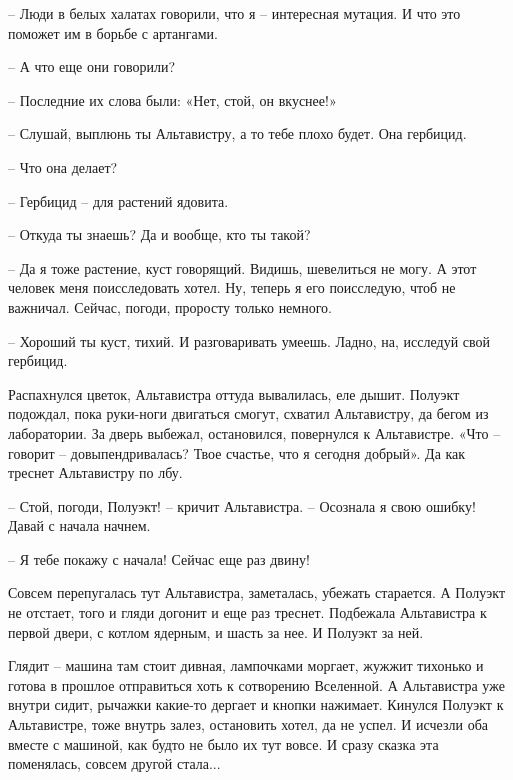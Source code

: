 \documentclass[ebook,oneside,final,openright]{memoir}
\begin{document}
– Люди в белых халатах говорили, что я – интересная мутация. И что это поможет им в борьбе с артангами.\par
– А что еще они говорили?\par
– Последние их слова были: «Нет, стой, он вкуснее!»\par
– Слушай, выплюнь ты Альтавистру, а то тебе плохо будет. Она гербицид.\par
– Что она делает?\par
– Гербицид – для растений ядовита.\par
– Откуда ты знаешь? Да и вообще, кто ты такой?\par
– Да я тоже растение, куст говорящий. Видишь, шевелиться не могу. А этот человек меня поисследовать хотел. Ну, теперь я его поисследую, чтоб не важничал. Сейчас, погоди, проросту только немного.\par
– Хороший ты куст, тихий. И разговаривать умеешь. Ладно, на, исследуй свой гербицид.\par
\par
Распахнулся цветок, Альтавистра оттуда вывалилась, еле дышит. Полуэкт подождал, пока руки-ноги двигаться смогут, схватил Альтавистру, да бегом из лаборатории. За дверь выбежал, остановился, повернулся к Альтавистре. «Что – говорит – довыпендривалась? Твое счастье, что я сегодня добрый». Да как треснет Альтавистру по лбу.\par
\par
– Стой, погоди, Полуэкт! – кричит Альтавистра. – Осознала я свою ошибку! Давай с начала начнем.\par
– Я тебе покажу с начала! Сейчас еще раз двину!\par
\par
Совсем перепугалась тут Альтавистра, заметалась, убежать старается. А Полуэкт не отстает, того и гляди догонит и еще раз треснет. Подбежала Альтавистра к первой двери, с котлом ядерным, и шасть за нее. И Полуэкт за ней.\par
\par
Глядит – машина там стоит дивная, лампочками моргает, жужжит тихонько и готова в прошлое отправиться хоть к сотворению Вселенной. А Альтавистра уже внутри сидит, рычажки какие-то дергает и кнопки нажимает. Кинулся Полуэкт к Альтавистре, тоже внутрь залез, остановить хотел, да не успел. И исчезли оба вместе с машиной, как будто не было их тут вовсе. И сразу сказка эта поменялась, совсем другой стала...\par
\end{document}
